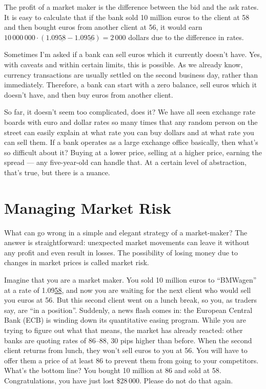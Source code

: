 \documentclass[a4paper,14pt]{extarticle}
\begin{document}
The profit of a market maker is the difference between the bid and the ask 
rates. It is easy to calculate that if the bank sold 10 million euros to the 
client at 58 and then bought euros from another client at 56, it would earn 
$10\,000\,000 \cdot (1.09\underline{58} - 1.09\underline{56}) = 2\,000$ dollars
due to the difference in rates.

Sometimes I'm asked if a bank can sell euros which it currently doesn't have. 
Yes, with caveats and within certain limits, this is possible. As we already 
know, currency transactions are usually settled on the second business day, 
rather than immediately. Therefore, a bank can start with a zero balance, sell 
euros which it doesn't have, and then buy euros from another client.

So far, it doesn't seem too complicated, does it? We have all seen exchange rate 
boards with euro and dollar rates so many times that any random person on the 
street can easily explain at what rate you can buy dollars and at what rate you 
can sell them. If a bank operates as a large exchange office basically, 
then what's so difficult about it? Buying at a lower price, selling at a higher 
price, earning the spread --- any five-year-old can handle that. At a certain 
level of abstraction, that's true, but there is a nuance.

\section*{Managing Market Risk}

What can go wrong in a simple and elegant strategy of a market-maker? The answer 
is straightforward: unexpected market movements can leave it without any profit 
and even result in losses. The possibility of losing money due to changes in 
market prices is called market risk.

Imagine that you are a market maker. You sold 10 million euros to ``BMWagen'' at 
a rate of 1.09\underline{58}, and now you are waiting for the next client who 
would sell you euros at 56. But this second client went on a lunch break, so 
you, as traders say, are ``in a position''. Suddenly, a news flash comes in: the 
European Central Bank (ECB) is winding down its quantitative easing program. 
While you are trying to figure out what that means, the market has already 
reacted: other banks are quoting rates of 86--88, 30 pips higher than before. 
When the second client returns from lunch, they won't sell euros to you at 56. 
You will have to offer them a price of at least 86 to prevent them from going to 
your competitors. What's the bottom line? You bought 10 million at 86 and sold 
at 58. Congratulations, you have just lost \$28\,000. Please do not do that 
again.
\end{document}
